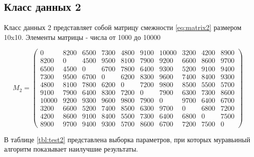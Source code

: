 \subsection{Класс данных 2}

Класс данных 2 представляет собой матрицу смежности \ref{eq:matrix2} размером 10x10.
Элементы матрицы - числа от 1000 до 10000

\begin{equation}
	\label{eq:matrix2}
	M_{2} = \begin{pmatrix}
        0 & 8200 & 6500 & 7300 & 4800 & 9100 & 10000 & 3200 & 4200 & 8900 \\
        8200 & 0 & 4500 & 9500 & 8100 & 7900 & 9200 & 6600 & 8600 & 9700 \\
        6500 & 4500 & 0 & 6700 & 7800 & 6400 & 9300 & 5200 & 9100 & 9400 \\
        7300 & 9500 & 6700 & 0 & 6200 & 8300 & 9600 & 7400 & 8400 & 9300 \\
        4800 & 8100 & 7800 & 6200 & 0 & 7200 & 9800 & 8500 & 5500 & 5700 \\
        9100 & 7900 & 6400 & 8300 & 7200 & 0 & 7900 & 6300 & 7300 & 8600 \\
        10000 & 9200 & 9300 & 9600 & 9800 & 7900 & 0 & 9700 & 6400 & 6700 \\
        3200 & 6600 & 5200 & 7400 & 8500 & 6300 & 9700 & 0 & 6800 & 7200 \\
        4200 & 8600 & 9100 & 8400 & 5500 & 7300 & 6400 & 6800 & 0 & 7500 \\
        8900 & 9700 & 9400 & 9300 & 5700 & 8600 & 6700 & 7200 & 7500 & 0
	\end{pmatrix}
\end{equation}

В таблице \ref{tbl:test2} представлена выборка параметров, при которых муравьиный алгоритм показывает наилучшие результаты.

